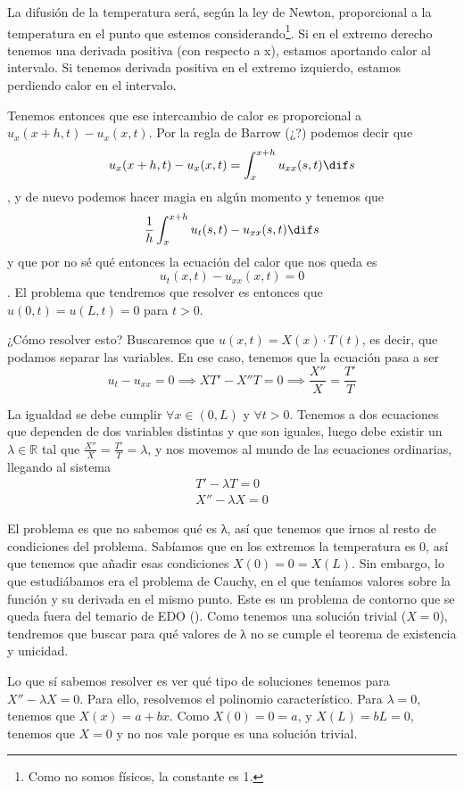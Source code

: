 \documentclass[palatino]{apuntes}
\begin{document}
La difusión de la temperatura será, según la ley de Newton, proporcional a la temperatura en el punto que estemos considerando\footnote{Como no somos físicos, la constante es 1.}. Si en el extremo derecho tenemos una derivada positiva (con respecto a x), estamos aportando calor al intervalo. Si tenemos derivada positiva en el extremo izquierdo, estamos perdiendo calor en el intervalo.

Tenemos entonces que ese intercambio de calor es proporcional a $u_x(x+h, t) - u_x(x,t)$. Por la regla de Barrow (¿?) podemos decir que \[ u_x(x+h, t) - u_x(x,t) = \int_x^{x+h} u_{xx}(s,t) \dif s\], y de nuevo podemos hacer magia en algún momento y tenemos que \[ \frac{1}{h} \int_{x}^{x+h} u_t(s,t) - u_{xx}(s,t) \dif s\] y que por no sé qué entonces la ecuación del calor que nos queda es \[ u_t(x,t) - u_{xx} (x,t) = 0\]. El problema que tendremos que resolver es entonces que $u(0,t) = u(L,t) = 0$ para $t > 0$.

¿Cómo resolver esto? Buscaremos que $u(x,t) = X(x) · T(t)$, es decir, que podamos separar las variables. En ese caso, tenemos que la ecuación pasa a ser \[ u_t - u_{xx} = 0 \implies XT' - X''T = 0 \implies \frac{X''}{X} = \frac{T'}{T} \]

La igualdad se debe cumplir $∀x ∈ (0,L)$ y $∀t > 0$. Tenemos a dos ecuaciones que dependen de dos variables distintas y que son iguales, luego debe existir un $λ ∈ ℝ$ tal que $\frac{X''}{X} = \frac{T'}{T} = λ$, y nos movemos al mundo de las ecuaciones ordinarias, llegando al sistema  \[ \begin{matrix} T' - λT = 0 \\ X'' - λX = 0 \end{matrix}\]

El problema es que no sabemos qué es λ, así que tenemos que irnos al resto de condiciones del problema. Sabíamos que en los extremos la temperatura es 0, así que tenemos que añadir esas condiciones $X(0) = 0 = X(L)$. Sin embargo, lo que estudiábamos era el problema de Cauchy, en el que teníamos valores sobre la función y su derivada en el mismo punto. Este es un problema de contorno que se queda fuera del temario de EDO (\cite{ApuntesEDO}). Como tenemos una solución trivial ($X = 0$), tendremos que buscar para qué valores de λ no se cumple el teorema de existencia y unicidad.

Lo que sí sabemos resolver es ver qué tipo de soluciones tenemos para $X'' - λX = 0$. Para ello, resolvemos el polinomio característico. Para $λ = 0$, tenemos que $X(x)  = a+bx$. Como $X(0) = 0 = a$, y $X(L) = bL = 0$, tenemos que $X = 0$ y no nos vale porque es una solución trivial.
\end{document}
